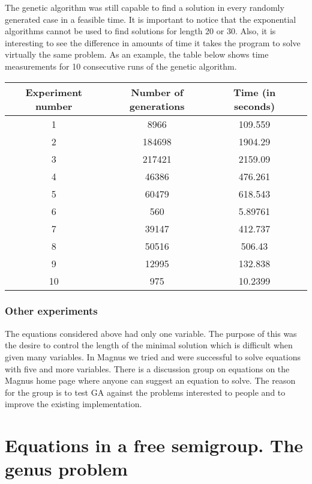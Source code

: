 \documentclass{article}
\begin{document}
The genetic algorithm was still capable to find a solution in every
randomly generated case in a feasible time. It is important to notice
that the exponential algorithms cannot be used to find solutions for
length 20 or 30. Also, it is interesting to see the difference in
amounts of time it takes the program to solve virtually the same
problem. As an example, the table below shows time measurements for 10
consecutive runs of the genetic algorithm.

\vspace{8mm}
\noindent
\begin{tabular}{|c|c|c|c|} \hline
Experiment number & Number of generations & Time (in seconds) \\ 
\hline
 1 & 8966 & 109.559 \\ \hline
 2 & 184698 & 1904.29 \\ \hline
 3 & 217421 & 2159.09 \\ \hline
 4 & 46386 & 476.261 \\ \hline
 5 & 60479 & 618.543 \\ \hline
 6 & 560 & 5.89761 \\ \hline
 7 & 39147 & 412.737 \\ \hline
 8 & 50516 & 506.43 \\ \hline
 9 & 12995 & 132.838 \\ \hline
10 & 975 & 10.2399 \\ \hline
\end{tabular}
\vspace{8mm}

  \subsubsection{Other experiments}

The equations considered above had only one variable. The purpose of
this was the desire to control the length of the minimal solution
which is difficult when given many variables. In Magnus we tried
and were successful to solve equations with five and more
variables. There is a discussion group on equations on the Magnus
home page \cite{Magnus} where anyone can suggest an equation to
solve. The reason for the group is to test GA against the problems
interested to people and to improve the existing implementation.


\section{Equations in a free semigroup. The genus problem}
\end{document}
